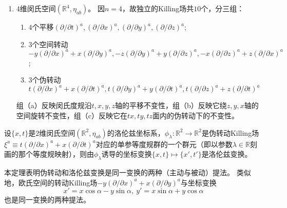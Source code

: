 \begin{example}
\begin{enumerate}[（1）]
\item $4$维闵氏空间$(\mathbb{R}^4, \eta_{ab})$。
因$n = 4$，故独立的Killing场共$10$个，分三组：
\begin{enumerate}[（a）]
\item $4$个平移$(\partial / \partial t)^a, (\partial / \partial x)^a, (\partial / \partial y)^a, (\partial / \partial z)^a$;
\item $3$个空间转动$-y(\partial / \partial x)^a + x(\partial / \partial y)^a, -z(\partial / \partial y)^a + y(\partial / \partial z)^a, -x(\partial / \partial z)^a + z(\partial / \partial x)^a$;
\item $3$个伪转动$t(\partial / \partial x)^a + x(\partial / \partial t)^a, t(\partial / \partial y)^a + y(\partial / \partial t)^a, t(\partial / \partial z)^a + z(\partial / \partial t)^a$
\end{enumerate}
组（a）反映闵氏度规沿$t, x, y, z$轴的平移不变性，组（b）反映它绕$z, y, x$轴的空间旋转不变性，组（c）反映它在$tx, ty, tz$面内的伪转动下的不变性。
\end{enumerate}
\end{example}

\begin{theorem}
设$\{x, t\}$是$2$维闵氏空间$(\mathbb{R}^2, \eta_{ab})$的洛伦兹坐标系，$\phi_\lambda \colon \mathbb{R}^2 \to \mathbb{R}^2$是伪转动Killing场$\xi^a \equiv t(\partial / \partial x)^a + x(\partial / \partial t)^a$对应的单参等度规群的一个群元（即以参数$\lambda \in \mathbb{R}$刻画的那个等度规映射），则由$\phi_\lambda$诱导的坐标变换$\{x, t\} \mapsto \{x', t'\}$是洛伦兹变换。
\end{theorem}

\begin{note}
本定理表明伪转动和洛伦兹变换是同一变换的两种（主动与被动）提法。
类似地，欧氏空间的转动Killing场$-y(\partial / \partial x)^a + x(\partial / \partial y)^a$与坐标变换
$$x' = x\cos\alpha - y\sin\alpha, ~ y' = x\sin\alpha + y\cos\alpha$$
也是同一变换的两种提法。
\end{note}

